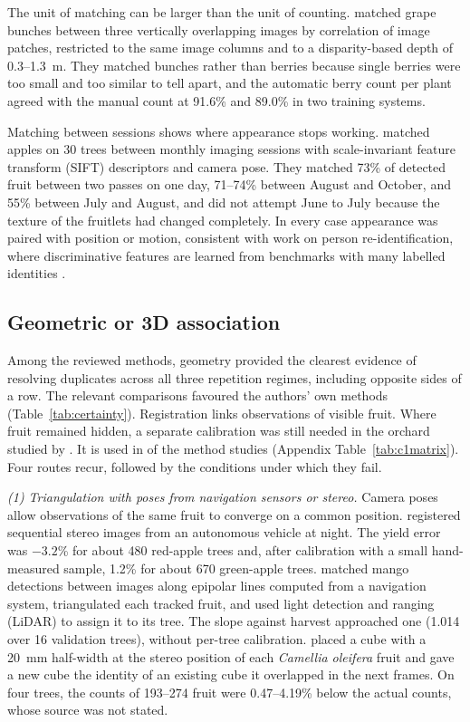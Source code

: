 The unit of matching can be larger than the unit of counting. \citet{zabawa2022image} matched grape bunches between three vertically overlapping images by correlation of image patches, restricted to the same image columns and to a disparity-based depth of 0.3--1.3~m. They matched bunches rather than berries because single berries were too small and too similar to tell apart, and the automatic berry count per plant agreed with the manual count at 91.6\% and 89.0\% in two training systems.

Matching between sessions shows where appearance stops working. \citet{mirbod2021field} matched apples on 30 trees between monthly imaging sessions with scale-invariant feature transform (SIFT) descriptors and camera pose. They matched 73\% of detected fruit between two passes on one day, 71--74\% between August and October, and 55\% between July and August, and did not attempt June to July because the texture of the fruitlets had changed completely. In every case appearance was paired with position or motion, consistent with work on person re-identification, where discriminative features are learned from benchmarks with many labelled identities \citep{ye2022deep}.

\subsection{Geometric or 3D association}\label{sec:mech-geom}
Among the reviewed methods, geometry provided the clearest evidence of resolving duplicates across all three repetition regimes, including opposite sides of a row. The relevant comparisons favoured the authors' own methods (Table~\ref{tab:certainty}). Registration links observations of visible fruit. Where fruit remained hidden, a separate calibration was still needed in the orchard studied by \citet{wang2013automated}. It is used in \nGeom of the \nMethod method studies (Appendix Table~\ref{tab:c1matrix}). Four routes recur, followed by the conditions under which they fail.

\textit{(1) Triangulation with poses from navigation sensors or stereo.} Camera poses allow observations of the same fruit to converge on a common position. \citet{wang2013automated} registered sequential stereo images from an autonomous vehicle at night. The yield error was $-3.2$\% for about 480 red-apple trees and, after calibration with a small hand-measured sample, 1.2\% for about 670 green-apple trees. \citet{stein2016image} matched mango detections between images along epipolar lines computed from a navigation system, triangulated each tracked fruit, and used light detection and ranging (LiDAR) to assign it to its tree. The slope against harvest approached one (1.014 over 16 validation trees), without per-tree calibration. \citet{wu2025counting} placed a cube with a 20~mm half-width at the stereo position of each \textit{Camellia oleifera} fruit and gave a new cube the identity of an existing cube it overlapped in the next frames. On four trees, the counts of 193--274 fruit were 0.47--4.19\% below the actual counts, whose source was not stated.

